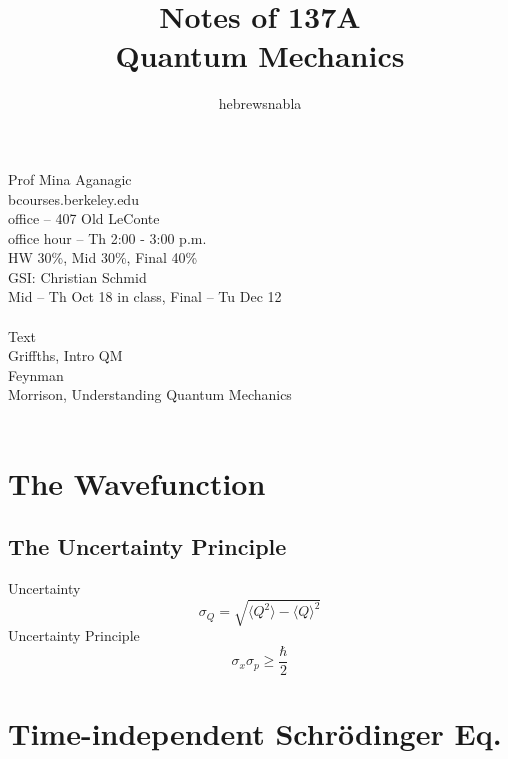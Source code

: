 \documentclass[UTF8]{ctexart} %
\title{Notes of 137A\\
Quantum Mechanics}
\author{hebrewsnabla}
\numberwithin{equation}{subsection}
\begin{document}
\maketitle

\tableofcontents

\newpage

Prof Mina Aganagic\\
bcourses.berkeley.edu\\
office -- 407 Old LeConte\\
office hour -- Th 2:00 - 3:00 p.m.\\
HW 30\%, Mid 30\%, Final 40\% \\
GSI: Christian Schmid\\
Mid -- Th Oct 18 in class, Final -- Tu Dec 12\\
~\\
Text\\
Griffths, Intro QM\\
Feynman\\
Morrison, Understanding Quantum Mechanics\\
~\\

\section{The Wavefunction}
\setcounter{subsection}{5}
\subsection{The Uncertainty Principle}
Uncertainty
\begin{equation}\label{key}
\sigma_Q = \sqrt{\langle Q^2\rangle - \langle Q\rangle^2}
\end{equation}
Uncertainty Principle
\begin{equation}\label{key}
\sigma_x\sigma_p \geq \dfrac{\hbar}{2}
\end{equation}

\section{Time-independent Schr\"odinger Eq.}
\end{document}
